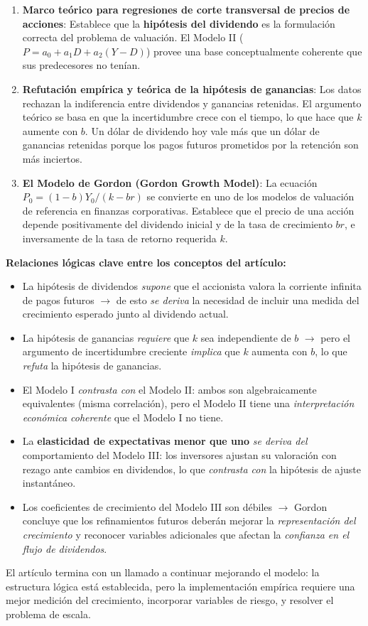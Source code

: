 \documentclass[12pt]{article}
\begin{document}
\begin{enumerate}
  \item \textbf{Marco te\'orico para regresiones de corte transversal de precios de acciones}: Establece que la \textbf{hip\'otesis del dividendo} es la formulaci\'on correcta del problema de valuaci\'on. El Modelo II ($P = a_0 + a_1 D + a_2 (Y-D)$) provee una base conceptualmente coherente que sus predecesores no ten\'ian.

  \item \textbf{Refutaci\'on emp\'irica y te\'orica de la hip\'otesis de ganancias}: Los datos rechazan la indiferencia entre dividendos y ganancias retenidas. El argumento te\'orico se basa en que la incertidumbre crece con el tiempo, lo que hace que $k$ aumente con $b$. Un d\'olar de dividendo hoy vale m\'as que un d\'olar de ganancias retenidas porque los pagos futuros prometidos por la retenci\'on son m\'as inciertos.

  \item \textbf{El Modelo de Gordon (Gordon Growth Model)}: La ecuaci\'on $P_0 = (1-b)Y_0 / (k-br)$ se convierte en uno de los modelos de valuaci\'on de referencia en finanzas corporativas. Establece que el precio de una acci\'on depende positivamente del dividendo inicial y de la tasa de crecimiento $br$, e inversamente de la tasa de retorno requerida $k$.
\end{enumerate}

\bigskip
\noindent\textbf{Relaciones l\'ogicas clave entre los conceptos del art\'iculo:}

\begin{itemize}
  \item La hip\'otesis de dividendos \textit{supone} que el accionista valora la corriente infinita de pagos futuros $\rightarrow$ de esto \textit{se deriva} la necesidad de incluir una medida del crecimiento esperado junto al dividendo actual.
  \item La hip\'otesis de ganancias \textit{requiere} que $k$ sea independiente de $b$ $\rightarrow$ pero el argumento de incertidumbre creciente \textit{implica} que $k$ aumenta con $b$, lo que \textit{refuta} la hip\'otesis de ganancias.
  \item El Modelo I \textit{contrasta con} el Modelo II: ambos son algebraicamente equivalentes (misma correlaci\'on), pero el Modelo II tiene una \textit{interpretaci\'on econ\'omica coherente} que el Modelo I no tiene.
  \item La \textbf{elasticidad de expectativas menor que uno} \textit{se deriva del} comportamiento del Modelo III: los inversores ajustan su valoraci\'on con rezago ante cambios en dividendos, lo que \textit{contrasta con} la hip\'otesis de ajuste instant\'aneo.
  \item Los coeficientes de crecimiento del Modelo III son d\'ebiles $\rightarrow$ Gordon concluye que los refinamientos futuros deber\'an mejorar la \textit{representaci\'on del crecimiento} y reconocer variables adicionales que afectan la \textit{confianza en el flujo de dividendos}.
\end{itemize}

\bigskip
El art\'iculo termina con un llamado a continuar mejorando el modelo: la estructura l\'ogica est\'a establecida, pero la implementaci\'on emp\'irica requiere una mejor medici\'on del crecimiento, incorporar variables de riesgo, y resolver el problema de escala.
\end{document}
